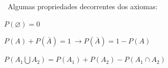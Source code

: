\documentclass{article}
\begin{document}
\begin{multicols}{2}
    \ Algumas propriedades decorrentes dos axiomas:
    \begin{list}{ - }{spacing}
      \item $ P( \varnothing ) = 0 $
      \item $ P(A) + P(\overset{\_}{A}) = 1 \ \rightarrow P(\overset{\_}{A}) = 1 - P(A) $
      \item $ P(A_1 \bigcup A_2) = P(A_1) + P(A_2) - P(A_1 \cap A_2) $
    \end{list}

    


\end{multicols} %
\end{document}
